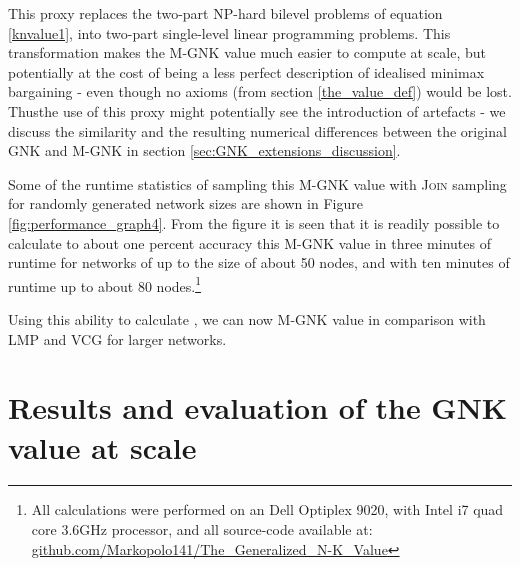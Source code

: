 This proxy replaces the two-part NP-hard bilevel problems of equation \ref{knvalue1}, into two-part single-level linear programming problems.
This transformation makes the M-GNK value much easier to compute at scale, but potentially at the cost of being a less perfect description of idealised minimax bargaining - even though no axioms (from section \ref{the_value_def}) would be lost.
Thus\DIFaddbegin \DIFadd{, }\DIFaddend the use of this proxy might potentially see the introduction of artefacts - we discuss the similarity and the resulting numerical differences between the original GNK and M-GNK in section \ref{sec:GNK_extensions_discussion}.

Some of the runtime statistics of sampling this M-GNK value with \textsc{Join} sampling for randomly generated network sizes \DIFaddbegin {}\DIFaddend are shown in Figure \ref{fig:performance_graph4}.
From the figure it is seen that it is readily possible to calculate to about one percent accuracy this M-GNK value in three minutes of runtime for networks of up to the size of about 50 nodes, and with ten minutes of runtime up to about 80 nodes.\footnote{\label{note1} All calculations were performed on an Dell Optiplex 9020, with Intel i7 quad core 3.6GHz processor, and all source-code available at:\\
\href{https://github.com/Markopolo141/The\_Generalized\_N-K\_Value}{github.com/Markopolo141/The\_Generalized\_N-K\_Value}}

Using this ability to calculate \DIFaddbegin {}\DIFaddend , we can now \DIFdelbegin {}\DIFdelend \DIFaddbegin {}\DIFaddend M-GNK value \DIFdelbegin {}\DIFdelend in comparison with LMP and VCG for larger networks.





\section{Results and evaluation of the GNK value at scale}\label{sec:results_and_evaluation_of_GNK}



